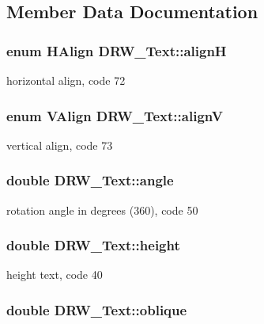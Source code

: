 \subsection{Member Data Documentation}
\hypertarget{classDRW__Text_ace4ad466c2d13111f69b4413c279987e}{
\subsubsection[{align\-H}]{\setlength{\rightskip}{0pt plus 5cm}enum {\bf H\-Align} D\-R\-W\-\_\-\-Text\-::align\-H}}\label{classDRW__Text_ace4ad466c2d13111f69b4413c279987e}
horizontal align, code 72 \hypertarget{classDRW__Text_a1b3c6431eb7c016e3521a46dc24bd57e}{
\subsubsection[{align\-V}]{\setlength{\rightskip}{0pt plus 5cm}enum {\bf V\-Align} D\-R\-W\-\_\-\-Text\-::align\-V}}\label{classDRW__Text_a1b3c6431eb7c016e3521a46dc24bd57e}
vertical align, code 73 \hypertarget{classDRW__Text_aad647ab8b0086a18978dd0b291569e5b}{
\subsubsection[{angle}]{\setlength{\rightskip}{0pt plus 5cm}double D\-R\-W\-\_\-\-Text\-::angle}}\label{classDRW__Text_aad647ab8b0086a18978dd0b291569e5b}
rotation angle in degrees (360), code 50 \hypertarget{classDRW__Text_ad38ec2dfef3ab3c4367423a0d4e49c05}{
\subsubsection[{height}]{\setlength{\rightskip}{0pt plus 5cm}double D\-R\-W\-\_\-\-Text\-::height}}\label{classDRW__Text_ad38ec2dfef3ab3c4367423a0d4e49c05}
height text, code 40 \hypertarget{classDRW__Text_ab273757633e67aa82b17b6b1141c8b98}{
\subsubsection[{oblique}]{\setlength{\rightskip}{0pt plus 5cm}double D\-R\-W\-\_\-\-Text\-::oblique}}\label{classDRW__Text_ab273757633e67aa82b17b6b1141c8b98}
